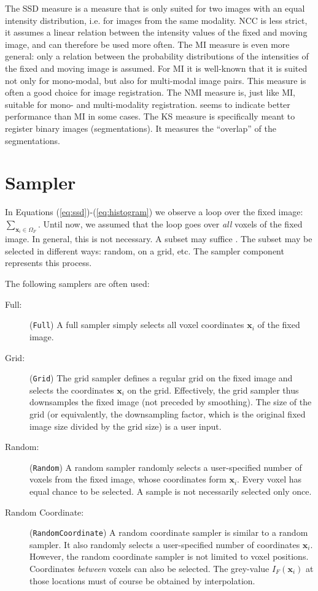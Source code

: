 \documentclass[]{report}
\newcommand{\vx}{\bm{x}}
\begin{document}
The SSD measure is a measure that is only suited for two images with
an equal intensity distribution, i.e. for images from the same
modality. NCC is less strict, it assumes a linear relation between
the intensity values of the fixed and moving image, and can therefore
be used more often. The MI measure is even more general: only a
relation between the probability distributions of the intensities of
the fixed and moving image is assumed. For MI it is well-known that
it is suited not only for mono-modal, but also for multi-modal image
pairs. This measure is often a good choice for image registration.
The NMI measure is, just like MI, suitable for mono- and
multi-modality registration. \cite{Stu99:NMI} seems to indicate
better performance than MI in some cases. The KS measure is
specifically meant to register binary images (segmentations). It
measures the ``overlap'' of the segmentations.

\section{Sampler}\label{sec:comp:sampler}

In Equations (\ref{eq:ssd})-(\ref{eq:histogram}) we observe a loop
over the fixed image: $\sum_{\vx_i \in \Omega_F}$. Until now, we
assumed that the loop goes over \emph{all} voxels of the fixed image.
In general, this is not necessary. A subset may suffice
\cite{ThevenazEA00a,KleinEA07}. The subset may be selected in
different ways: random, on a grid, etc. The sampler component
represents this process.

The following samplers are often used:
\begin{description}
\item[Full:] (\texttt{Full}) A full sampler simply selects all voxel coordinates $\vx_i$ of the
fixed image.

\item[Grid:] (\texttt{Grid}) The grid sampler defines a regular grid on the fixed
image and selects the coordinates $\vx_i$ on the grid. Effectively,
the grid sampler thus downsamples the fixed image (not preceded by
smoothing). The size of the grid (or equivalently, the downsampling
factor, which is the original fixed image size divided by the grid
size) is a user input.

\item[Random:] (\texttt{Random}) A random sampler randomly selects a user-specified number of
voxels from the fixed image, whose coordinates form $\vx_i$. Every
voxel has equal chance to be selected. A sample is not necessarily
selected only once.

\item[Random Coordinate:] (\texttt{RandomCoordinate}) A random coordinate sampler is similar
to a random sampler. It also randomly selects a user-specified number
of coordinates $\vx_i$. However, the random coordinate sampler is not
limited to voxel positions. Coordinates \emph{between} voxels can
also be selected. The grey-value $I_F(\vx_i)$ at those locations must
of course be obtained by interpolation.

\end{description}
\end{document}
